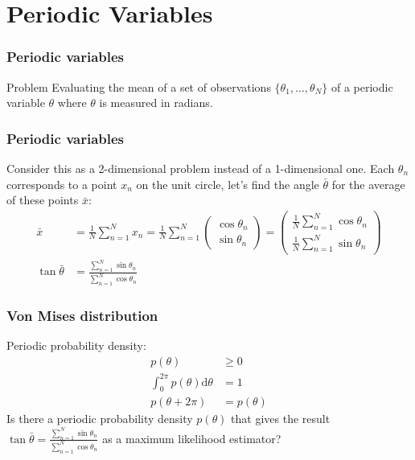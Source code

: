 \documentclass{beamer}
\begin{document}
\section{Periodic Variables}

\begin{frame}
    \frametitle{Periodic variables}
    \begin{block}{Problem}
        Evaluating the mean of a set of observations $\{\theta_{1},\hdots,\theta_{N}\}$ of a periodic variable $\theta$ where $\theta$ is measured in radians.
    \end{block}
\end{frame}

\begin{frame}
    \frametitle{Periodic variables}
    Consider this as a 2-dimensional problem instead of a 1-dimensional one. Each $\theta_{n}$ corresponds to a point $x_{n}$ on the unit circle, let's find the angle $\bar{\theta}$ for the average of these points $\bar{x}$:
    \begin{align*}
        \bar{x}&=\frac{1}{N}\sum_{n=1}^{N}x_{n}=\frac{1}{N}\sum_{n=1}^{N}\begin{pmatrix}
            \cos\theta_{n} \\
            \sin\theta_{n}
        \end{pmatrix}
        =\begin{pmatrix}
            \frac{1}{N}\sum_{n=1}^{N}\cos\theta_{n} \\
            \frac{1}{N}\sum_{n=1}^{N}\sin\theta_{n}
        \end{pmatrix} \\
        \tan\bar{\theta}&=\frac{\sum_{n=1}^{N}\sin\theta_{n}}{\sum_{n=1}^{N}\cos\theta_{n}}
    \end{align*}
\end{frame}

\begin{frame}
    \frametitle{Von Mises distribution}
    Periodic probability density:
    \begin{align*}
        p(\theta)&\ge{}0 \\
        \int_{0}^{2\pi}p(\theta)\mathrm{d}\theta&=1 \\
        p(\theta+2\pi)&=p(\theta)
    \end{align*}
    Is there a periodic probability density $p(\theta)$ that gives the result $\tan\bar{\theta}=\frac{\sum_{n=1}^{N}\sin\theta_{n}}{\sum_{n=1}^{N}\cos\theta_{n}}$ as a maximum likelihood estimator?
\end{frame}
\end{document}

